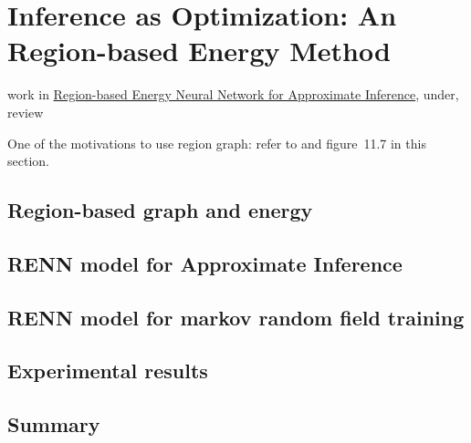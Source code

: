 \chapter{Inference as Optimization: An Region-based Energy Method}
work in \href{https://github.com/FirstHandScientist/paper_renn}{Region-based Energy Neural Network for Approximate Inference}, under, review

One of the motivations to use region graph: refer to \cite[section~11.3.5.3]{koller2009pgm} and figure~11.7 in this section.

\section{Region-based graph and energy}

\section{RENN model for Approximate Inference}

\section{RENN model for markov random field training}

\section{Experimental results}

\section{Summary}

